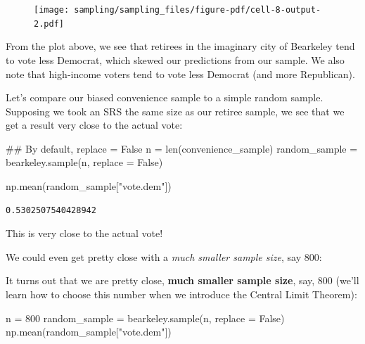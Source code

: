 \documentclass[
  letterpaper,
  DIV=11,
  numbers=noendperiod]{scrreprt}
\newenvironment{Shaded}{\begin{snugshade}}{\end{snugshade}}
\newcommand{\BuiltInTok}[1]{\textcolor[rgb]{0.00,0.23,0.31}{#1}}
\newcommand{\CommentTok}[1]{\textcolor[rgb]{0.37,0.37,0.37}{#1}}
\newcommand{\DecValTok}[1]{\textcolor[rgb]{0.68,0.00,0.00}{#1}}
\newcommand{\NormalTok}[1]{\textcolor[rgb]{0.00,0.23,0.31}{#1}}
\newcommand{\OperatorTok}[1]{\textcolor[rgb]{0.37,0.37,0.37}{#1}}
\newcommand{\StringTok}[1]{\textcolor[rgb]{0.13,0.47,0.30}{#1}}
\newcommand{\VariableTok}[1]{\textcolor[rgb]{0.07,0.07,0.07}{#1}}
\begin{document}
\begin{figure}[H]

{\centering \texttt{[image: sampling/sampling\_files/figure-pdf/cell-8-output-2.pdf]}

}

\end{figure}

From the plot above, we see that retirees in the imaginary city of
Bearkeley tend to vote less Democrat, which skewed our predictions from
our sample. We also note that high-income voters tend to vote less
Democrat (and more Republican).

Let's compare our biased convenience sample to a simple random sample.
Supposing we took an SRS the same size as our retiree sample, we see
that we get a result very close to the actual vote:

\begin{Shaded}
\begin{Highlighting}[]
\CommentTok{\#\# By default, replace = False}
\NormalTok{n }\OperatorTok{=} \BuiltInTok{len}\NormalTok{(convenience\_sample)}
\NormalTok{random\_sample }\OperatorTok{=}\NormalTok{ bearkeley.sample(n, replace }\OperatorTok{=} \VariableTok{False}\NormalTok{)}

\NormalTok{np.mean(random\_sample[}\StringTok{"vote.dem"}\NormalTok{])}
\end{Highlighting}
\end{Shaded}

\begin{verbatim}
0.5302507540428942
\end{verbatim}

This is very close to the actual vote!

We could even get pretty close with a \emph{much smaller sample size},
say 800:

It turns out that we are pretty close, \textbf{much smaller sample
size}, say, 800 (we'll learn how to choose this number when we introduce
the Central Limit Theorem):

\begin{Shaded}
\begin{Highlighting}[]
\NormalTok{n }\OperatorTok{=} \DecValTok{800}
\NormalTok{random\_sample }\OperatorTok{=}\NormalTok{ bearkeley.sample(n, replace }\OperatorTok{=} \VariableTok{False}\NormalTok{)}
\NormalTok{np.mean(random\_sample[}\StringTok{"vote.dem"}\NormalTok{])}
\end{Highlighting}
\end{Shaded}
\end{document}
